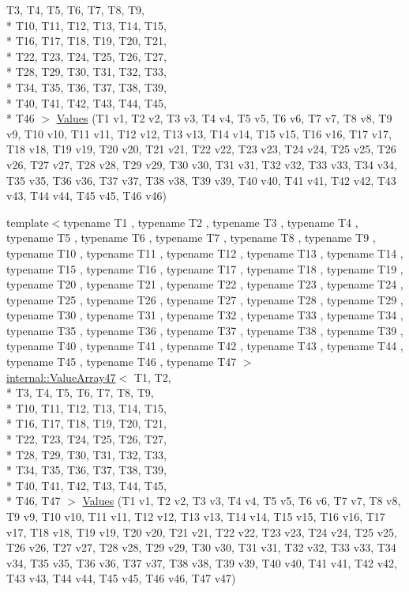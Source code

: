 \begin{DoxyCompactItemize}
T3, T4, T5, T6, T7, T8, T9, \\*
T10, T11, T12, T13, T14, T15, \\*
T16, T17, T18, T19, T20, T21, \\*
T22, T23, T24, T25, T26, T27, \\*
T28, T29, T30, T31, T32, T33, \\*
T34, T35, T36, T37, T38, T39, \\*
T40, T41, T42, T43, T44, T45, \\*
T46 $>$ \hyperlink{namespacetesting_a8f5536906a9d6780467c8ae53a420dad}{Values} (T1 v1, T2 v2, T3 v3, T4 v4, T5 v5, T6 v6, T7 v7, T8 v8, T9 v9, T10 v10, T11 v11, T12 v12, T13 v13, T14 v14, T15 v15, T16 v16, T17 v17, T18 v18, T19 v19, T20 v20, T21 v21, T22 v22, T23 v23, T24 v24, T25 v25, T26 v26, T27 v27, T28 v28, T29 v29, T30 v30, T31 v31, T32 v32, T33 v33, T34 v34, T35 v35, T36 v36, T37 v37, T38 v38, T39 v39, T40 v40, T41 v41, T42 v42, T43 v43, T44 v44, T45 v45, T46 v46)
\item 
{\footnotesize template$<$typename T1 , typename T2 , typename T3 , typename T4 , typename T5 , typename T6 , typename T7 , typename T8 , typename T9 , typename T10 , typename T11 , typename T12 , typename T13 , typename T14 , typename T15 , typename T16 , typename T17 , typename T18 , typename T19 , typename T20 , typename T21 , typename T22 , typename T23 , typename T24 , typename T25 , typename T26 , typename T27 , typename T28 , typename T29 , typename T30 , typename T31 , typename T32 , typename T33 , typename T34 , typename T35 , typename T36 , typename T37 , typename T38 , typename T39 , typename T40 , typename T41 , typename T42 , typename T43 , typename T44 , typename T45 , typename T46 , typename T47 $>$ }\\\hyperlink{classtesting_1_1internal_1_1ValueArray47}{internal\-::\-Value\-Array47}$<$ T1, T2, \\*
T3, T4, T5, T6, T7, T8, T9, \\*
T10, T11, T12, T13, T14, T15, \\*
T16, T17, T18, T19, T20, T21, \\*
T22, T23, T24, T25, T26, T27, \\*
T28, T29, T30, T31, T32, T33, \\*
T34, T35, T36, T37, T38, T39, \\*
T40, T41, T42, T43, T44, T45, \\*
T46, T47 $>$ \hyperlink{namespacetesting_aba2697b2cd3e9d667ab3807022303240}{Values} (T1 v1, T2 v2, T3 v3, T4 v4, T5 v5, T6 v6, T7 v7, T8 v8, T9 v9, T10 v10, T11 v11, T12 v12, T13 v13, T14 v14, T15 v15, T16 v16, T17 v17, T18 v18, T19 v19, T20 v20, T21 v21, T22 v22, T23 v23, T24 v24, T25 v25, T26 v26, T27 v27, T28 v28, T29 v29, T30 v30, T31 v31, T32 v32, T33 v33, T34 v34, T35 v35, T36 v36, T37 v37, T38 v38, T39 v39, T40 v40, T41 v41, T42 v42, T43 v43, T44 v44, T45 v45, T46 v46, T47 v47)

\end{DoxyCompactItemize}
